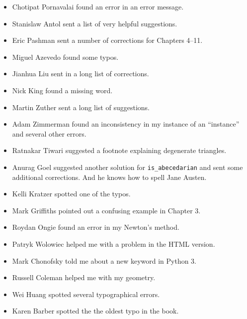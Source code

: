\documentclass[10pt]{book}
\begin{document}
\begin{CJK}{UTF8}{gbsn}
\begin{itemize}
\item Chotipat Pornavalai found an error in an error message.

\item Stanislaw Antol sent a list of very helpful suggestions.

\item Eric Pashman sent a number of corrections for Chapters 4--11.

\item Miguel Azevedo found some typos.

\item Jianhua Liu sent in a long list of corrections.

\item Nick King found a missing word.

\item Martin Zuther sent a long list of suggestions.

\item Adam Zimmerman found an inconsistency in my instance
of an ``instance'' and several other errors.

\item Ratnakar Tiwari suggested a footnote explaining degenerate
triangles.

\item Anurag Goel suggested another solution for \verb"is_abecedarian"
and sent some additional corrections.  And he knows how to
spell Jane Austen.

\item Kelli Kratzer spotted one of the typos.

\item Mark Griffiths pointed out a confusing example in Chapter 3.

\item Roydan Ongie found an error in my Newton's method.

\item Patryk Wolowiec helped me with a problem in the HTML version.

\item Mark Chonofsky told me about a new keyword in Python 3.

\item Russell Coleman helped me with my geometry.

\item Wei Huang spotted several typographical errors.

\item Karen Barber spotted the the oldest typo in the book.


\end{itemize}
\end{CJK}
\end{document}
